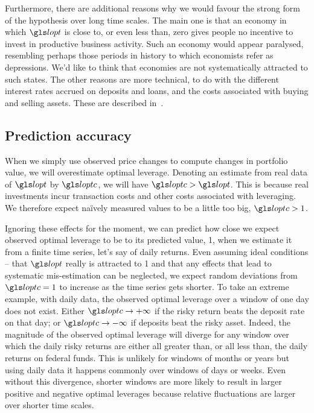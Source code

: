 Furthermore, there are additional reasons why we would favour the strong form of the hypothesis over long time scales. The main one is that an economy in which $\lopt$ is close to, or even less than, zero gives people no incentive to invest in productive business activity. Such an economy would appear paralysed, resembling perhaps those periods in history to which economists refer as depressions. We'd like to think that economies are not systematically attracted to such states. The other reasons are more technical, to do with the different interest rates accrued on deposits and loans, and the costs associated with buying and selling assets. These are described in~\cite{PetersAdamou2013}. 


\subsection{Prediction accuracy}
When we simply use observed price changes to compute changes in portfolio value, we will overestimate optimal leverage. Denoting an estimate from real data of $\lopt$ by $\loptc$, we will  have $\loptc>\lopt$. This is because real investments incur transaction costs and other costs associated with leveraging. We therefore expect na\"ively measured values to be a little too big, $\loptc>1$. 

Ignoring these effects for the moment, we can predict how close we expect observed optimal leverage to be to its predicted value, 1, when we estimate it from a finite time series, let's say of daily returns. Even assuming ideal conditions -- that $\lopt$ really is attracted to 1 and that any effects that lead to systematic mis-estimation can be neglected, we expect random
deviations from $\loptc=1$ to increase as the time series gets shorter. To take an extreme example, with daily data, the observed optimal leverage over a
window of one day does not exist. Either $\loptc \to+\infty$ if the
risky return beats the deposit rate on that day; or $\loptc \to -\infty$ if
deposits beat the risky asset. Indeed, the magnitude of the observed
optimal leverage will diverge for any window over which the daily
risky returns are either all greater than, or all less than, the daily returns on federal
funds. This is unlikely for windows of months or years but using daily data it happens
commonly over windows of days or weeks. Even without this
divergence, shorter windows are more likely to result in larger
positive and negative optimal leverages because relative fluctuations
are larger over shorter time scales.

